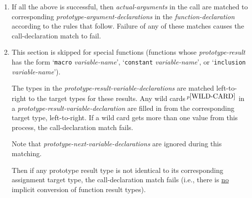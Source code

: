 \documentclass[12pt]{article}
\newcommand{\pagref}[1]{p\pageref{#1}}
\newcommand{\pagnote}[1]{$\,^{p\pageref{#1}}$}
\begin{document}
\begin{enumerate}
A {\em call-term} {\em argument-list} with implied parentheses
is treated as if it had {\tt (~)} parentheses.

If in a left-to-right scan of a {\em call-term},
a {\em call-argument-list} with {\tt (~)} is expected but instead
a {\tt [~]} bracketed {\em call-argument-list} or
the end of the {\em call-term} is found,
an empty list {\tt ()} is inserted into the {\em call-term}.

If a {\em call-argument-list} is shorter than the
corresponding {\em pattern-argument-list}, and all omitted
arguments at the end of the {\em call-argument-list} have {\em default-values}
in the {\em pattern-argument-list}, the {\em default-values} corresponding
to the omitted arguments are added to
the end of the {\em call-argument-list}.
The {\em default-values} are compiled in the context of the
{\em function-declaration} and not the context of the {\em function-call}:
see \pagref{DEFAULT-CONTEXT}.

At this point the {\em pattern-argument-lists} in the prototype
{\em pattern-term} must match in order all the {\em call-argument-lists}
in the {\em call-term} in type of bracket and number
of arguments, else the call-declaration match fails.

\item If all the above is successful, then {\em actual-arguments}
in the call are matched to corresponding {\em prototype-argument-declarations}
in the {\em function-declaration} according to the rules that follow.
Failure of any of these matches causes
the call-declaration match to fail.

\item\label{CALL-DECLARATION-TARGET-MATCHING}
This section is skipped for special functions (functions whose
{\em prototype-result} has the form `{\tt macro} {\em variable-name}',
`{\tt constant} {\em variable-name}', or
`{\tt inclusion} {\em variable-name}').

The types in the {\em prototype-result-variable-declarations} are
matched left-to-right to the target types for these results.
Any wild cards\pagnote{WILD-CARD} in a
{\em prototype-result-variable-declaration}
are filled in from the corresponding target type, left-to-right.
If a wild card gets more
than one value from this process, the call-declaration match fails.

Note that {\em prototype-next-variable-declarations} are ignored
during this matching.

Then if any prototype result type is not identical to its corresponding
assignment target type, the call-declaration match fails
(i.e., there is \underline{no} implicit conversion of function result
types).


\end{enumerate}
\end{document}
